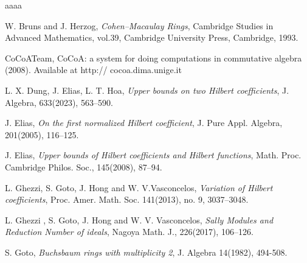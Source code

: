 \documentclass[reqno,a4paper,dvipsnames]{amsart}
\theoremstyle{definition}
\begin{document}
\providecommand{\bysame}{\leavevmode\hbox to3em{\hrulefill}\thinspace}
\providecommand{\MR}{\relax\ifhmode\unskip\space\fi MR }
\providecommand{\MRhref}[2]{
  \href{http://www.ams.org/mathscinet-getitem?mr=#1}{#2}
}


 \begin{thebibliography}{aaaa}

 
 W. Bruns and J. Herzog, \textit{Cohen–Macaulay Rings}, Cambridge Studies in Advanced Mathematics, vol.39, Cambridge University Press, Cambridge, 1993.


  CoCoATeam, CoCoA: a system for doing computations in commutative algebra (2008). Available at http://
cocoa.dima.unige.it


  L. X. Dung, J. Elias, L. T. Hoa, \textit{Upper bounds on two Hilbert coefficients}, J. Algebra, 633(2023), 563–590.


 J. Elias, \textit{On the first normalized Hilbert coefficient}, J. Pure Appl. Algebra, 201(2005), 116–125.

 J. Elias, \textit{Upper bounds of Hilbert coefficients and Hilbert functions}, Math. Proc. Cambridge Philos. Soc., 145(2008), 87–94.
 

 L. Ghezzi, S. Goto, J. Hong and W. V.Vasconcelos,
\textit{Variation of Hilbert coefficients},
Proc. Amer. Math. Soc. 141(2013), no. 9, 3037–3048.


 L. Ghezzi , S. Goto, J. Hong and W. V. Vasconcelos, \textit{Sally Modules and Reduction Number of ideals}, Nagoya Math. J., 226(2017), 106–126.

 S. Goto, \textit{Buchsbaum rings with multiplicity 2}, J. Algebra 14(1982), 494-508.  




\end{thebibliography}
\end{document}
